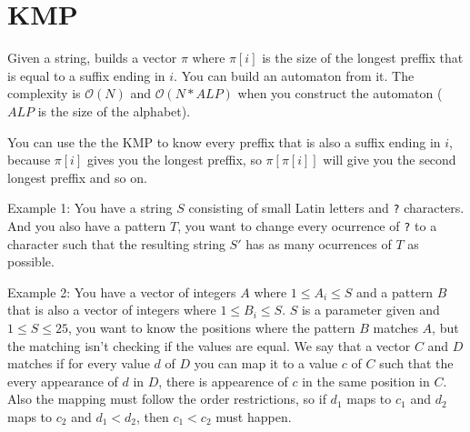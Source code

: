 \section{KMP}
Given a string, builds a vector $\pi$ where $\pi[i]$ is the size of the longest preffix that is equal to a suffix ending in $i$. You can build an automaton from it. The complexity is $\mathcal{O}(N)$ and $\mathcal{O}(N*ALP)$ when you construct the automaton ($ALP$ is the size of the alphabet).

You can use the the KMP to know every preffix that is also a suffix ending in $i$, because $\pi[i]$ gives you the longest preffix, so $\pi[\pi[i]]$ will give you the second longest preffix and so on.

Example 1: You have a string $S$ consisting of small Latin letters and \texttt{?} characters. And you also have a pattern $T$, you want to change every ocurrence of \texttt{?} to a character such that the resulting string $S'$ has as many ocurrences of $T$ as possible.


Example 2: You have a vector of integers $A$ where $1 \le A_i \le S$ and a pattern $B$ that is also a vector of integers where $1 \le B_i \le S$. $S$ is a parameter given and $1 \le S \le 25$, you want to know the positions where the pattern $B$ matches $A$, but the matching isn't checking if the values are equal. We say that a vector $C$ and $D$ matches if for every value $d$ of $D$ you can map it to a value $c$ of $C$ such that the every appearance of $d$ in $D$, there is appearence of $c$ in the same position in $C$. Also the mapping must follow the order restrictions, so if $d_1$ maps to $c_1$ and $d_2$ maps to $c_2$ and $d_1 < d_2$, then $c_1 < c_2$ must happen.

